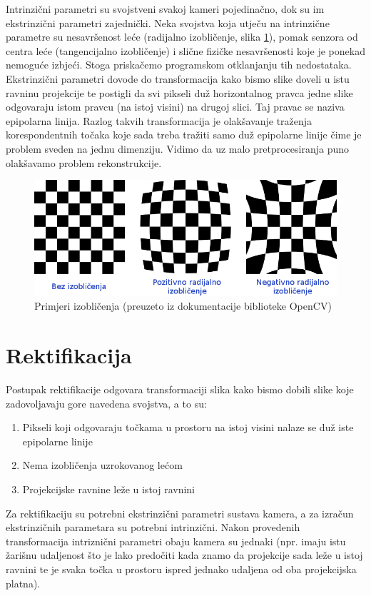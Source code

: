 \documentclass[utf8, zavrsni, numeric]{fer}
\begin{document}
Intrinzični parametri su svojstveni svakoj kameri pojedinačno, dok su im ekstrinzični parametri zajednički. Neka svojstva koja utječu na intrinzične parametre su nesavršenost leće (radijalno izobličenje, slika \ref{fig:primjeri-distorzije}), pomak senzora
od centra leće (tangencijalno izobličenje) i slične fizičke nesavršenosti koje je ponekad nemoguće izbjeći. Stoga priskačemo programskom otklanjanju tih nedostataka.
Ekstrinzični parametri dovode do transformacija kako bismo slike doveli u istu ravninu projekcije te postigli da svi pikseli duž horizontalnog pravca jedne slike odgovaraju istom pravcu (na istoj visini) na drugoj slici.
Taj pravac se naziva epipolarna linija. Razlog takvih transformacija je olakšavanje traženja korespondentnih točaka koje sada treba tražiti samo duž epipolarne linije čime je problem sveden na jednu dimenziju. Vidimo da uz malo pretprocesiranja puno olakšavamo problem rekonstrukcije.

\begin{figure}[htb]
  \centering
  \includegraphics[width=13cm]{img/distortion_examples.png}
  \caption{Primjeri izobličenja (preuzeto iz dokumentacije biblioteke OpenCV)}
  \label{fig:primjeri-distorzije}
\end{figure}

\section{Rektifikacija}
Postupak rektifikacije odgovara transformaciji slika kako bismo dobili slike koje zadovoljavaju gore navedena svojstva, a to su:
\begin{enumerate}
  \item Pikseli koji odgovaraju točkama u prostoru na istoj visini nalaze se duž iste epipolarne linije
  \item Nema izobličenja uzrokovanog lećom
  \item Projekcijske ravnine leže u istoj ravnini
\end{enumerate}
Za rektifikaciju su potrebni ekstrinzični parametri sustava kamera, a za izračun ekstrinzičnih parametara su potrebni intrinzični.
Nakon provedenih transformacija intriznični parametri obaju kamera su jednaki (npr. imaju istu žarišnu udaljenost što je lako predočiti kada znamo da projekcije sada leže u istoj ravnini te je svaka točka
u prostoru ispred jednako udaljena od oba projekcijska platna).
\end{document}
